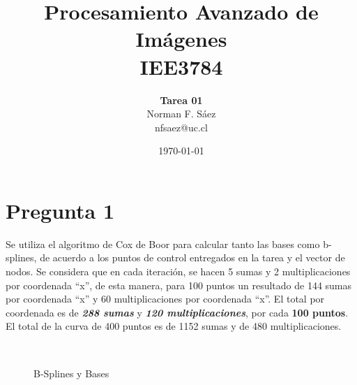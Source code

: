 \documentclass[a4paper,10pt]{article}
\title{Procesamiento Avanzado de Imágenes\\IEE3784}
\author{\textbf{Tarea 01}\\Norman F. Sáez\\nfsaez@uc.cl}
\date{\today}
\begin{document}
\maketitle
\section{Pregunta 1}
Se utiliza el algoritmo de Cox de Boor para calcular tanto las bases como
b-splines, de acuerdo a los puntos de control entregados en la tarea y el
vector de nodos.  Se considera que en cada iteración, se hacen 5 sumas y  2
multiplicaciones por coordenada ``x'', de esta manera, para 100 puntos un resultado de
144 sumas por coordenada ``x'' y 60 multiplicaciones por
coordenada ``x''. El total por coordenada es de \textbf{\textit{288
sumas}} y \textbf{\textit{120 multiplicaciones}}, por cada \textbf{100 puntos}.
El total de la curva de 400 puntos es de 1152 sumas y de 480 multiplicaciones.

\begin{figure}[ht!]
  \centering
  ~ 
  ~ 
  \caption{B-Splines y Bases}
  \label{fig:p1}
\end{figure}
\end{document}
